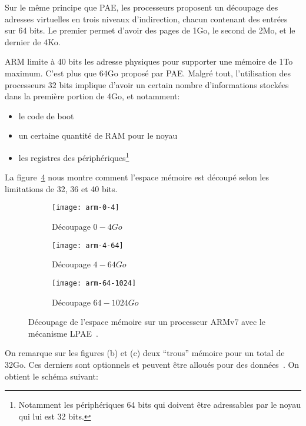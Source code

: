       Sur le même principe que PAE, les processeurs proposent un découpage des
      adresses virtuelles en trois niveaux d'indirection, chacun contenant des
      entrées sur 64 bits. Le premier permet d'avoir des pages de 1Go, le second
      de 2Mo, et le dernier de 4Ko.

      ARM limite à 40 bits les adresse physiques pour supporter une mémoire de
      1To maximum. C'est plus que 64Go proposé par PAE. Malgré tout,
      l'utilisation des processeurs 32 bits implique d'avoir un certain nombre
      d'informations stockées dans la première portion de 4Go, et notamment:

      \begin{itemize}
        \item le code de boot
        \item un certaine quantité de RAM pour le noyau
        \item les registres des périphériques\footnote{Notamment les
          périphériques 64 bits qui doivent être adressables par le noyau qui
          lui est 32 bits.}
      \end{itemize}

      La figure~\ref{fig:arm-0-1024} nous montre comment l'espace mémoire est
      découpé selon les limitations de 32, 36 et 40 bits.

      \begin{figure}[ht]
        \begin{subfigure}[b]{0.37\linewidth}
          \texttt{[image: arm-0-4]}
          \caption{Découpage $0-4Go$}
          \label{fig:arm-0-4}
        \end{subfigure}
        \begin{subfigure}[b]{0.37\textwidth}
          \texttt{[image: arm-4-64]}
          \caption{Découpage $4-64Go$}
          \label{fig:arm-4-64}
        \end{subfigure}
        \begin{subfigure}[b]{0.23\textwidth}
          \texttt{[image: arm-64-1024]}
          \caption{Découpage $64-1024Go$}
          \label{fig:arm-64-1024}
        \end{subfigure}
        \caption{Découpage de l'espace mémoire sur un processeur ARMv7 avec le
          mécanisme LPAE~\citep{arm2012principles}.}
        \label{fig:arm-0-1024}
      \end{figure}

      On remarque sur les figures (b) et (c) deux ``trous'' mémoire pour un
      total de 32Go. Ces derniers sont optionnels et peuvent être alloués pour
      des données~\citep{arm2012principles}. On obtient le schéma suivant:

